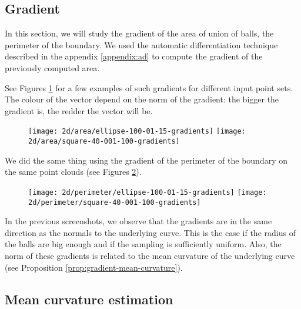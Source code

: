 \subsection{Gradient}

In this section, we will study the gradient of the area of union of balls, the
perimeter of the boundary. We used the automatic differentiation technique
described in the appendix \ref{appendix:ad} to compute the gradient of the
previously computed area.

See Figures \ref{fig:gradients_area_2d} for a few examples of such gradients
for different input point sets. The colour of the vector depend on the norm of
the gradient: the bigger the gradient is, the redder the vector will be.

\begin{figure}[h]
    \centering

    \texttt{[image: 2d/area/ellipse-100-01-15-gradients]}
    \texttt{[image: 2d/area/square-40-001-100-gradients]}
    \label{fig:gradients_area_2d}
\end{figure}

We did the same thing using the gradient of the perimeter of the boundary on the
same point clouds (see Figures \ref{fig:gradients_perimeter_2d}).

\begin{figure}[h]
    \centering
    \texttt{[image: 2d/perimeter/ellipse-100-01-15-gradients]}
    \texttt{[image: 2d/perimeter/square-40-001-100-gradients]}

    \label{fig:gradients_perimeter_2d}
\end{figure}

In the previous screenshots, we observe that the gradients are in the same
direction as the normals to the underlying curve. This is the case if the radius
of the balls are big enough and if the sampling is sufficiently uniform. Also,
the norm of these gradients is related to the mean curvature of the underlying
curve (see Proposition \ref{prop:gradient-mean-curvature}).

\subsection{Mean curvature estimation}

